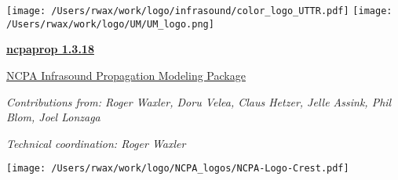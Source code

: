 \documentclass[10pt]{article}
\newcommand{\version}{1.3.18}
\begin{document}
\newpage

\vspace*{-50pt}
\texttt{[image: /Users/rwax/work/logo/infrasound/color\_logo\_UTTR.pdf]}
\hspace*{65pt}
\texttt{[image: /Users/rwax/work/logo/UM/UM\_logo.png]}
\vspace*{50pt}


\vspace*{0.05\textheight}

\begin{center}

\begin{Huge} \underline{\textbf{ncpaprop \version}} \end{Huge} 

\vspace*{0.025\textheight} 

\begin{Large}
\underline{NCPA Infrasound Propagation Modeling Package}
\end{Large} 

\vspace*{0.06\textheight}

\textsl{Contributions from: Roger Waxler, Doru Velea, Claus Hetzer, Jelle Assink, Phil Blom, Joel Lonzaga}

\vspace*{0.02\textheight}

\textsl{Technical coordination: Roger Waxler}

\end{center}

\vspace*{0.06\textheight}

\begin{center}
\texttt{[image: /Users/rwax/work/logo/NCPA\_logos/NCPA-Logo-Crest.pdf]}

\end{center}

\vfill



\newpage
\tableofcontents
\newpage


\newpage

\newpage

\newpage

\newpage

\newpage

\newpage

\newpage

\newpage

\newpage

\newpage


\newpage


\end{document}
